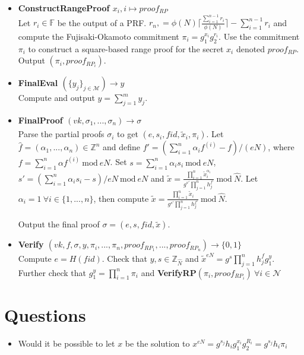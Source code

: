\begin{algorithm}
\begin{itemize}
\item\textbf{ConstructRangeProof $x_i,i \mapsto proof_{RP}$}\\
Let $r_i\in\mathds{F}$ be the output of a PRF. $r_n, = \phi(N)\lceil \frac{\sum_{i=1}^{n-1}r_i}{\phi(N)}\rceil- \sum_{i=1}^{n-1}r_i $ and compute the Fujisaki-Okamoto commitment $\pi_i=g_1^{x_i}g_2^{r_i}$.
Use the commitment $\pi_i$ to construct a square-based range proof for the secret $x_i$ denoted $proof_{RP}$. Output $(\pi_i,proof_{RP_i})$.
 
\item\textbf{FinalEval $(\{y_j\}_{j\in\mathcal{M}})\xrightarrow[]{}y$}\\
Compute and output $y = \sum_{j=1}^m y_{j}$.

\item\textbf{FinalProof $(vk,\sigma_1,...,\sigma_n)\xrightarrow[]{}\sigma$}\\
Parse the partial proofs $\sigma_i$ to get $(e,s_i,fid,\tilde{x}_i,\pi_i)$.  
Let $\hat{f}= (\alpha_1,...,\alpha_n)\in\mathds{Z}^n$ and define $f' = ( \sum_{i=1}^n \alpha_if^(i)-f)/(eN)$, where $f=\sum_{i=1}^n\alpha f^{(i)} \: \text{mod}\:eN$. Set $s= \sum_{i=1}^n\alpha_is_i \: \text{mod}\:eN$, $s' = (\sum_{i=1}^n \alpha_i s_i -s)/eN \: \text{mod}\: eN$ and $\tilde{x} = \frac{\prod_{i=1}^n \tilde{x}_i^{\alpha_i}}{g^{s'}\prod_{j=1}^n h_j ^{f'}} \: \text{mod}\: \hat{N}$. Let $\alpha_i =1 \: \forall i\in\{1,...,n\}$, then compute  $\tilde{x} = \frac{\prod_{i=1}^n \tilde{x}_i}{g^{s'}\prod_{j=1}^n h_j ^{f'}} \: \text{mod}\: \hat{N}$.

Output the final proof $\sigma = (e,s,fid,\tilde{x})$.

\item\textbf{Verify $(vk,f,\sigma,y,\pi_i,...,\pi_n,proof_{RP_1},...,proof_{RP_n})\xrightarrow[]{}\{0,1\}$}\\
Compute $e=H(fid)$. Check that $y,s\in\mathds{Z}_\hat{N}$ and $\tilde{x}^{eN} = g^s\prod_{j=1}^n h_j^{f}g_1^y$. Further check that $g_1^y =\prod_{i=1}^n \pi_i$ and \textbf{VerifyRP}$(\pi_i,proof_{RP_i})\: \forall i\in\mathcal{N}$ 
\end{itemize}
\label{alg:VAHSS-LSS}
\end{algorithm}

\section*{Questions}
\begin{itemize}
\item Would it be possible to let $x$ be the solution to $x^{eN} = g^{s_j}h_ig_1^{x_i}g_2^{R_i} =  g^{s_j}h_i\pi_i $
\end{itemize}
